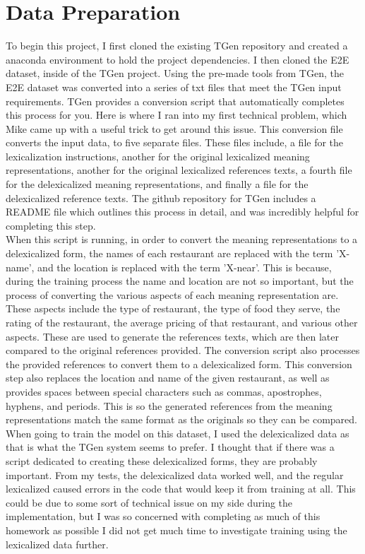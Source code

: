 \documentclass[12pt]{article}
\begin{document}
\section{Data Preparation}
To begin this project, I first cloned the existing TGen repository and created a anaconda environment to hold the project dependencies. I then cloned the E2E dataset, inside of the TGen project. Using the pre-made tools from TGen, the E2E dataset was converted into a series of txt files that meet the TGen input requirements. TGen provides a conversion script that automatically completes this process for you. Here is where I ran into my first technical problem, which Mike came up with a useful trick to get around this issue. This conversion file converts the input data, to five separate files. These files include, a file for the lexicalization instructions, another for the original lexicalized meaning representations, another for the original lexicalized references texts, a fourth file for the delexicalized meaning representations, and finally a file for the delexicalized reference texts. The github repository for TGen includes a README file which outlines this process in detail, and was incredibly helpful for completing this step. \\

When this script is running, in order to convert the meaning representations to a delexicalized form, the names of each restaurant are replaced with the term 'X-name', and the location is replaced with the term 'X-near'. This is because, during the training process the name and location are not so important, but the process of converting the various aspects of each meaning representation are. These aspects include the type of restaurant, the type of food they serve, the rating of the restaurant, the average pricing of that restaurant, and various other aspects. These are used to generate the references texts, which are then later compared to the original references provided. The conversion script also processes the provided references to convert them to a delexicalized form. This conversion step also replaces the location and name of the given restaurant, as well as provides spaces between special characters such as commas, apostrophes, hyphens, and periods. This is so the generated references from the meaning representations match the same format as the originals so they can be compared. \\

When going to train the model on this dataset, I used the delexicalized data as that is what the TGen system seems to prefer. I thought that if there was a script dedicated to creating these delexicalized forms, they are probably important. From my tests, the delexicalized data worked well, and the regular lexicalized caused errors in the code that would keep it from training at all. This could be due to some sort of technical issue on my side during the implementation, but I was so concerned with completing as much of this homework as possible I did not get much time to investigate training using the lexicalized data further. \\
\end{document}
